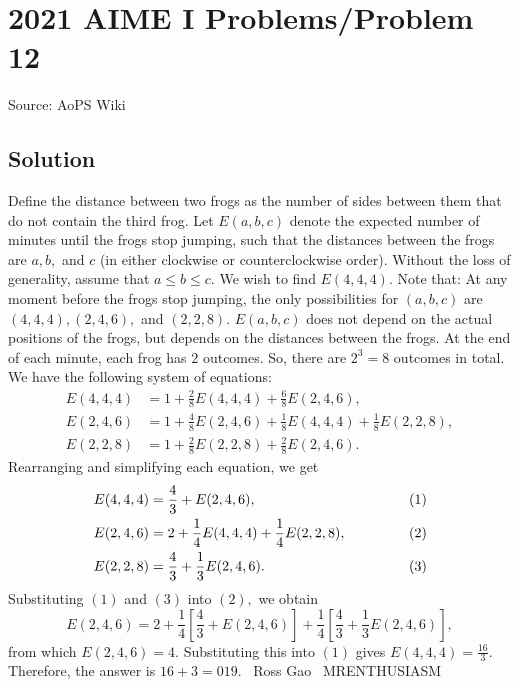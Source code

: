 \documentclass[12pt]{article}
\begin{document}
\section*{{2021 AIME I Problems/Problem 12}}
Source: AoPS Wiki

\subsection*{Solution}
Define the distance between two frogs as the number of sides between them that do not contain the third frog. Let $E(a,b,c)$ denote the expected number of minutes until the frogs stop jumping, such that the distances between the frogs are $a,b,$ and $c$ (in either clockwise or counterclockwise order). Without the loss of generality, assume that $a\leq b\leq c.$ We wish to find $E(4,4,4).$ Note that: At any moment before the frogs stop jumping, the only possibilities for $(a,b,c)$ are $(4,4,4),(2,4,6),$ and $(2,2,8).$ $E(a,b,c)$ does not depend on the actual positions of the frogs, but depends on the distances between the frogs. At the end of each minute, each frog has $2$ outcomes. So, there are $2^3=8$ outcomes in total. We have the following system of equations: \begin{align*} E(4,4,4)&=1+\frac{2}{8}E(4,4,4)+\frac{6}{8}E(2,4,6), \\ E(2,4,6)&=1+\frac{4}{8}E(2,4,6)+\frac{1}{8}E(4,4,4)+\frac{1}{8}E(2,2,8), \\ E(2,2,8)&=1+\frac{2}{8}E(2,2,8)+\frac{2}{8}E(2,4,6). \end{align*} Rearranging and simplifying each equation, we get \begin{align*} E(4,4,4)&=\frac{4}{3}+E(2,4,6), &(1) \\ E(2,4,6)&=2+\frac{1}{4}E(4,4,4)+\frac{1}{4}E(2,2,8), &\hspace{12.75mm}(2) \\ E(2,2,8)&=\frac{4}{3}+\frac{1}{3}E(2,4,6). &(3) \end{align*} Substituting $(1)$ and $(3)$ into $(2),$ we obtain \[E(2,4,6)=2+\frac{1}{4}\left[\frac{4}{3}+E(2,4,6)\right]+\frac{1}{4}\left[\frac{4}{3}+\frac{1}{3}E(2,4,6)\right],\] from which $E(2,4,6)=4.$ Substituting this into $(1)$ gives $E(4,4,4)=\frac{16}{3}.$ Therefore, the answer is $16+3=\boxed{019}.$ ~Ross Gao ~MRENTHUSIASM
\end{document}
